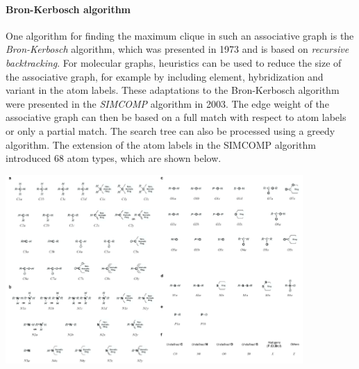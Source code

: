\paragraph{Bron-Kerbosch algorithm}

One algorithm for finding the maximum clique in such an associative graph is the \emph{Bron-Kerbosch} algorithm, which was presented in 1973 and is based on \emph{recursive backtracking}. For molecular graphs, heuristics can be used to reduce the size of the associative graph, for example by including element, hybridization and variant in the atom labels. These adaptations to the Bron-Kerbosch algorithm were presented in the \emph{SIMCOMP} algorithm in 2003. The edge weight of the associative graph can then be based on a full match with respect to atom labels or only a partial match. The search tree can also be processed using a greedy algorithm. The extension of the atom labels in the SIMCOMP algorithm introduced 68 atom types, which are shown below.

\begin{center}\includegraphics[width=0.85\textwidth]{img/cheminformatics/McsSimcompAtoms.png}\end{center}

